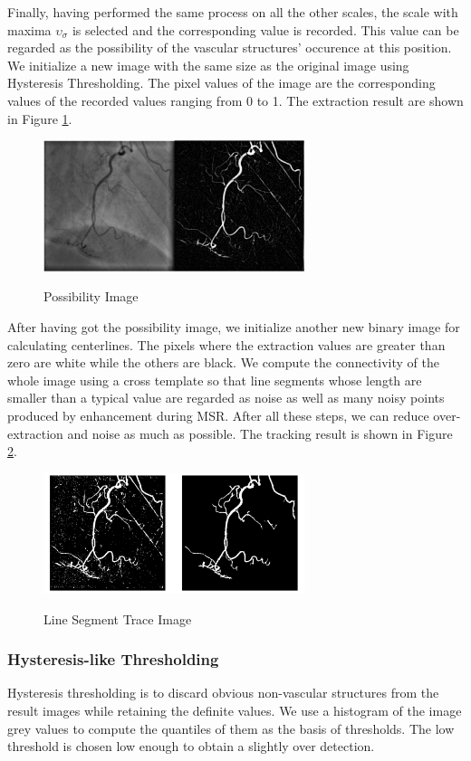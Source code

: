 Finally, having performed the same process on all the other scales,
the scale with maxima $\upsilon_{\sigma}$ is selected and the
corresponding value is recorded. This value can be regarded as the
possibility of the vascular structures' occurence at this position. We
initialize a new image with the same size as the original image using
Hysteresis Thresholding. The pixel values of the image are the
corresponding values of the recorded values ranging from 0 to 1. The
extraction result are shown in Figure \ref{fig:possibilityimage}.

\begin{figure}
  \centering
  \includegraphics[width=3.0in]{possibilityimage.png}\\
  \caption{Possibility Image}\label{fig:possibilityimage}
\end{figure}

After having got the possibility image, we initialize another new
binary image for calculating centerlines. The pixels where the
extraction values are greater than zero are white while the others are
black. We compute the connectivity of the whole image using a cross
template so that line segments whose length are smaller than a typical
value are regarded as noise as well as many noisy points produced by
enhancement during MSR. After all these steps, we can reduce
over-extraction and noise as much as possible. The tracking result is
shown in Figure \ref{fig:lineseg_trace}.
\begin{figure}
  \centering
  \includegraphics[width=3.0in]{lineseg_trace.png}\\
  \caption{Line Segment Trace Image}\label{fig:lineseg_trace}
\end{figure}

\subsubsection{Hysteresis-like Thresholding}
Hysteresis thresholding is to discard obvious non-vascular structures from
the result images while retaining the definite values. We use a histogram of
the image grey values to compute the quantiles of them as the basis of
thresholds. The low threshold is chosen low enough to obtain a slightly over
detection.
